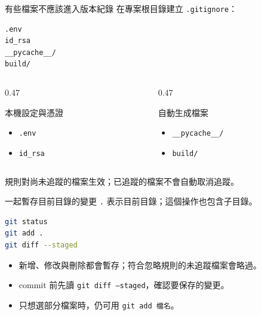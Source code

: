 \documentclass[xetex, unicode, 10pt, aspectratio=169]{beamer}
\begin{document}
\begin{frame}[fragile]{有些檔案不應該進入版本紀錄}
在專案根目錄建立 \texttt{.gitignore}：
\begin{lstlisting}
.env
id_rsa
__pycache__/
build/
\end{lstlisting}
    \begin{columns}[t]
        \begin{column}{0.47\textwidth}
            \begin{block}{本機設定與憑證}
                \begin{itemize}
                    \small\setlength{\itemsep}{0pt}
                    \item \texttt{.env}
                    \item \texttt{id\_rsa}
                \end{itemize}
            \end{block}
        \end{column}
        \begin{column}{0.47\textwidth}
            \begin{block}{自動生成檔案}
                \begin{itemize}
                    \small\setlength{\itemsep}{0pt}
                    \item \texttt{\_\_pycache\_\_/}
                    \item \texttt{build/}
                \end{itemize}
            \end{block}
        \end{column}
    \end{columns}
    {\small 規則對尚未追蹤的檔案生效；已追蹤的檔案不會自動取消追蹤。}
\end{frame}

\begin{frame}[fragile]{一起暫存目前目錄的變更}
    \texttt{.} 表示目前目錄；這個操作也包含子目錄。
\begin{lstlisting}[language=bash]
git status
git add .
git diff --staged
\end{lstlisting}
    \begin{itemize}
        \item 新增、修改與刪除都會暫存；符合忽略規則的未追蹤檔案會略過。
        \item commit 前先讀 \texttt{git diff --staged}，確認要保存的變更。
        \item 只想選部分檔案時，仍可用 \texttt{git add 檔名}。
    \end{itemize}
\end{frame}
\end{document}
